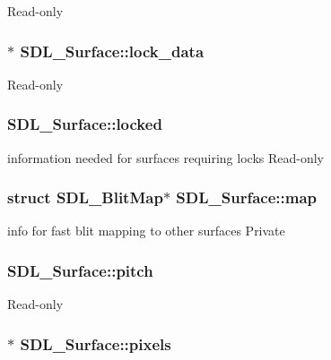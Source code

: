 Read-\/only \hypertarget{struct_s_d_l___surface_a0afacfb933b54a9af0846a307a6924fb}{
\subsubsection[{lock\-\_\-data}]{$\ast$ S\-D\-L\-\_\-\-Surface\-::lock\-\_\-data}}\label{struct_s_d_l___surface_a0afacfb933b54a9af0846a307a6924fb}
Read-\/only \hypertarget{struct_s_d_l___surface_a5022edaeea1c0a055fa5d6dccba41de2}{
\subsubsection[{locked}]{ S\-D\-L\-\_\-\-Surface\-::locked}}\label{struct_s_d_l___surface_a5022edaeea1c0a055fa5d6dccba41de2}
information needed for surfaces requiring locks Read-\/only \hypertarget{struct_s_d_l___surface_a8c1ecad399b0d4f525b1a53b6ee9393f}{
\subsubsection[{map}]{\setlength{\rightskip}{0pt plus 5cm}struct S\-D\-L\-\_\-\-Blit\-Map$\ast$ S\-D\-L\-\_\-\-Surface\-::map}}\label{struct_s_d_l___surface_a8c1ecad399b0d4f525b1a53b6ee9393f}
info for fast blit mapping to other surfaces Private \hypertarget{struct_s_d_l___surface_a5fa37325d77d65b2ed64ffc7cd01bb6c}{
\subsubsection[{pitch}]{ S\-D\-L\-\_\-\-Surface\-::pitch}}\label{struct_s_d_l___surface_a5fa37325d77d65b2ed64ffc7cd01bb6c}
Read-\/only \hypertarget{struct_s_d_l___surface_abd9597e0e084b8ef33fe0397bc26d911}{
\subsubsection[{pixels}]{$\ast$ S\-D\-L\-\_\-\-Surface\-::pixels}}\label{struct_s_d_l___surface_abd9597e0e084b8ef33fe0397bc26d911}
